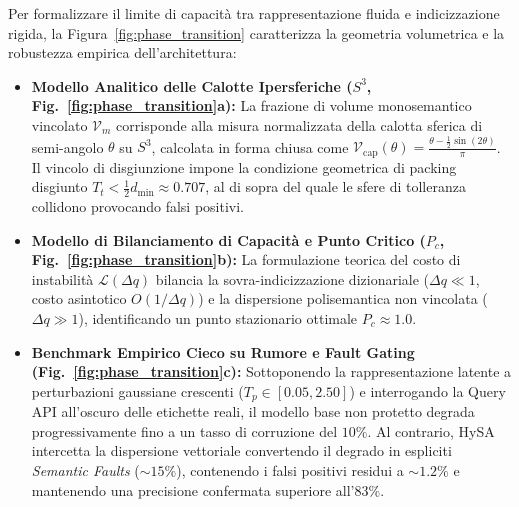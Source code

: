 \documentclass[11pt,a4paper]{article}
\theoremstyle{definition}
\begin{document}
Per formalizzare il limite di capacità tra rappresentazione fluida e indicizzazione rigida, la Figura~\ref{fig:phase_transition} caratterizza la geometria volumetrica e la robustezza empirica dell'architettura:
\begin{itemize}[leftmargin=*, itemsep=1.5pt]
    \item \textbf{Modello Analitico delle Calotte Ipersferiche ($S^3$, Fig.~\ref{fig:phase_transition}a):} La frazione di volume monosemantico vincolato $\mathcal{V}_m$ corrisponde alla misura normalizzata della calotta sferica di semi-angolo $\theta$ su $S^3$, calcolata in forma chiusa come $\mathcal{V}_{\mathrm{cap}}(\theta) = \frac{\theta - \frac{1}{2}\sin(2\theta)}{\pi}$. Il vincolo di disgiunzione impone la condizione geometrica di packing disgiunto $T_t < \frac{1}{2} d_{\min} \approx 0.707$, al di sopra del quale le sfere di tolleranza collidono provocando falsi positivi.
    \item \textbf{Modello di Bilanciamento di Capacità e Punto Critico ($P_c$, Fig.~\ref{fig:phase_transition}b):} La formulazione teorica del costo di instabilità $\mathcal{L}(\Delta q)$ bilancia la sovra-indicizzazione dizionariale ($\Delta q \ll 1$, costo asintotico $O(1/\Delta q)$) e la dispersione polisemantica non vincolata ($\Delta q \gg 1$), identificando un punto stazionario ottimale $P_c \approx 1.0$.
    \item \textbf{Benchmark Empirico Cieco su Rumore e Fault Gating (Fig.~\ref{fig:phase_transition}c):} Sottoponendo la rappresentazione latente a perturbazioni gaussiane crescenti ($T_p \in [0.05, 2.50]$) e interrogando la Query API all'oscuro delle etichette reali, il modello base non protetto degrada progressivamente fino a un tasso di corruzione del $10\%$. Al contrario, HySA intercetta la dispersione vettoriale convertendo il degrado in espliciti \textit{Semantic Faults} ($\sim 15\%$), contenendo i falsi positivi residui a $\sim 1.2\%$ e mantenendo una precisione confermata superiore all'$83\%$.
\end{itemize}
\end{document}
